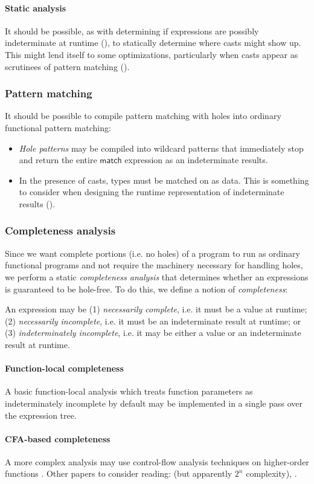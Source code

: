 \documentclass[index.tex]{subfiles}
\begin{document}
\paragraph{Static analysis}
It should be possible, as with determining if expressions are possibly indeterminate at runtime
(), to statically determine where casts might show up. This might lend
itself to some optimizations, particularly when casts appear as scrutinees of pattern matching
().

\subsubsection{Pattern matching}
\label{pattern-matching}
It should be possible to compile pattern matching with holes into ordinary functional pattern
matching:
\begin{itemize}
  \item \emph{Hole patterns} may be compiled into wildcard patterns that immediately stop and return
    the entire $\textsf{match}$ expression as an indeterminate results.
  \item In the presence of casts, types must be matched on as data. This is something to consider
    when designing the runtime representation of indeterminate results
    ().
\end{itemize}

\subsubsection{Completeness analysis}
\label{completeness-analysis}
Since we want complete portions (i.e. no holes) of a program to run as ordinary functional programs
and not require the machinery necessary for handling holes, we perform a static \emph{completeness
analysis} that determines whether an expressions is guaranteed to be hole-free. To do this, we
define a notion of \emph{completeness}:
%
\begin{definition}[name=Completeness, label=completeness]
  An expression may be (1) \emph{necessarily complete}, i.e. it must be a value at runtime; (2)
  \emph{necessarily incomplete}, i.e. it must be an indeterminate result at runtime; or (3)
  \emph{indeterminately incomplete}, i.e. it may be either a value or an indeterminate result at
  runtime.
\end{definition}
%

\paragraph{Function-local completeness}
A basic function-local analysis which treats function parameters as indeterminately
incomplete by default may be implemented in a single pass over the expression tree.

\paragraph{CFA-based completeness}
A more complex analysis may use control-flow analysis techniques on higher-order functions
\cite{shivers1991, nielson1999}. Other papers to consider reading: \textcite{vardoulaskis2011} (but
apparently $2^{n}$ complexity), \textcite{gilray2016}.
\end{document}
